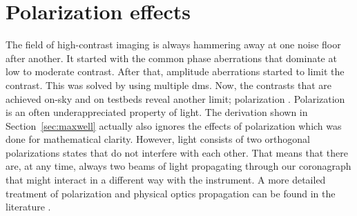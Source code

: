\documentclass[letterpaper]{ar-1col}
\newcommand{\notebooksuggestion}[1]{\textcolor{blue}{[Notebook: #1]}}
\begin{document}



\section{Polarization effects} 


The field of high-contrast imaging is always hammering away at one noise floor after another. It started with the common phase aberrations that dominate at low to moderate contrast. After that, amplitude aberrations started to limit the contrast. This was solved by using multiple \acp{dm}. Now, the contrasts that are achieved on-sky and on testbeds reveal another limit; polarization \citep{Schmid18,millar2022polarization,vanHolstein23, baudoz2024polarization}. Polarization is an often underappreciated property of light. The derivation shown in Section~\ref{sec:maxwell} actually also ignores the effects of polarization which was done for mathematical clarity. However, light consists of two orthogonal polarizations states that do not interfere with each other. That means that there are, at any time, always two beams of light propagating through our coronagraph that might interact in a different way with the instrument. A more detailed treatment of polarization and physical optics propagation can be found in the literature \citep{McLeod14}.
\end{document}
